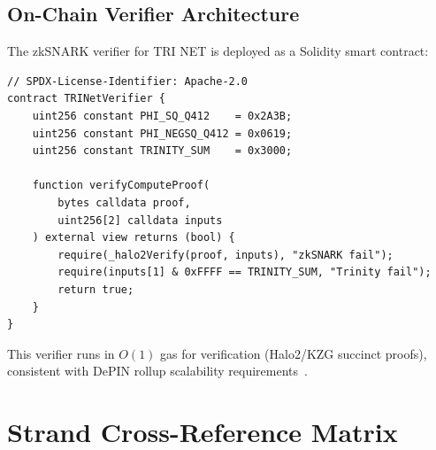 \subsection{On-Chain Verifier Architecture}

The zkSNARK verifier for TRI NET is deployed as a Solidity smart contract:

\begin{verbatim}
// SPDX-License-Identifier: Apache-2.0
contract TRINetVerifier {
    uint256 constant PHI_SQ_Q412    = 0x2A3B;
    uint256 constant PHI_NEGSQ_Q412 = 0x0619;
    uint256 constant TRINITY_SUM    = 0x3000;

    function verifyComputeProof(
        bytes calldata proof,
        uint256[2] calldata inputs
    ) external view returns (bool) {
        require(_halo2Verify(proof, inputs), "zkSNARK fail");
        require(inputs[1] & 0xFFFF == TRINITY_SUM, "Trinity fail");
        return true;
    }
}
\end{verbatim}

This verifier runs in \(O(1)\) gas for verification (Halo2/KZG succinct proofs),
consistent with DePIN rollup scalability requirements~\cite{fan2023rollup}.


\section{Strand Cross-Reference Matrix}
\label{sec:flos74-appendix-c}

